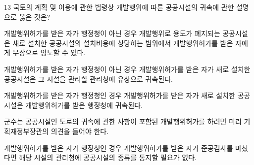 \begin{question}{13}
국토의 계획 및 이용에 관한 법령상 개발행위에 따른 공공시설의 귀속에 관한 설명으로 옳은 것은?
\begin{choices}
  \item 개발행위허가를 받은 자가 행정청이 아닌 경우 개발행위로 용도가 폐지되는 공공시설은 새로 설치한 공공시설의 설치비용에 상당하는 범위에서 개발행위허가를 받은 자에게 무상으로 양도할 수 있다.
  \item 개발행위허가를 받은 자가 행정청이 아닌 경우 개발행위허가를 받은 자가 새로 설치한 공공시설은 그 시설을 관리할 관리청에 유상으로 귀속된다.
  \item 개발행위허가를 받은 자가 행정청인 경우 개발행위허가를 받은 자가 새로 설치한 공공시설은 개발행위허가를 받은 행정청에 귀속된다.
  \item 군수는 공공시설인 도로의 귀속에 관한 사항이 포함된 개발행위허가를 하려면 미리 기획재정부장관의 의견을 들어야 한다.
  \item 개발행위허가를 받은 자가 행정청인 경우 개발행위허가를 받은 자가 준공검사를 마쳤다면 해당 시설의 관리청에 공공시설의 종류를 통지할 필요가 없다.
\end{choices}
\end{question}
